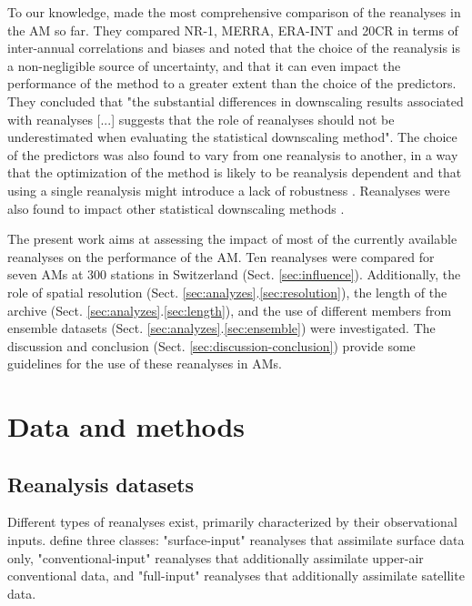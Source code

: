 \documentclass[smallextended]{svjour3}       %
\begin{document}
	To our knowledge, \citet{Dayon2015} made the most comprehensive comparison of the reanalyses in the AM so far. They compared NR-1, MERRA, ERA-INT and 20CR in terms of inter-annual correlations and biases and noted that the choice of the reanalysis is a non-negligible source of uncertainty, and that it can even impact the performance of the method to a greater extent than the choice of the predictors. They concluded that "the substantial differences in downscaling results associated with reanalyses [...] suggests that the role of reanalyses should not be underestimated when evaluating the statistical downscaling method". The choice of the predictors was also found to vary from one reanalysis to another, in a way that the optimization of the method is likely to be reanalysis dependent and that using a single reanalysis might introduce a lack of robustness \citep{Dayon2015}. Reanalyses were also found to impact other statistical downscaling methods \citep[e.g.][]{Koukidis2009}.
	
	The present work aims at assessing the impact of most of the currently available reanalyses on the performance of the AM. Ten reanalyses were compared for seven AMs at 300 stations in Switzerland (Sect. \ref{sec:influence}). Additionally, the role of spatial resolution (Sect. \ref{sec:analyzes}.\ref{sec:resolution}), the length of the archive (Sect. \ref{sec:analyzes}.\ref{sec:length}), and the use of different members from ensemble datasets (Sect. \ref{sec:analyzes}.\ref{sec:ensemble}) were investigated. The discussion and conclusion (Sect. \ref{sec:discussion-conclusion}) provide some guidelines for the use of these reanalyses in AMs.
	
	
	\section{Data and methods}
	\label{sec:data}
	
	\subsection{Reanalysis datasets}
	
	Different types of reanalyses exist, primarily characterized by their observational inputs. \citet{Fujiwara2017} define three classes: "surface-input" reanalyses that assimilate surface data only, "conventional-input" reanalyses that additionally assimilate upper-air conventional data, and "full-input" reanalyses that additionally assimilate satellite data.
	
\end{document}
